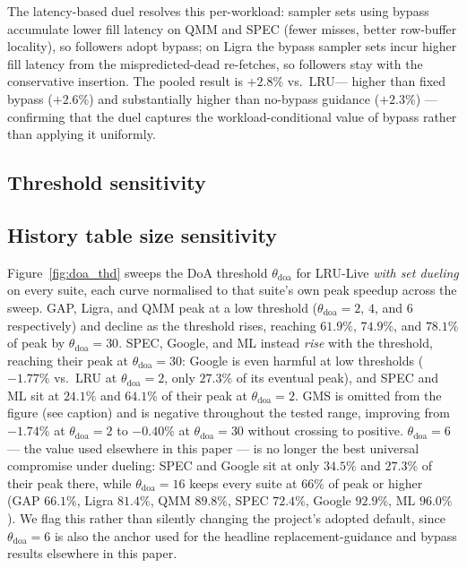 \documentclass[conference]{IEEEtran}
\newcommand{\lru}{\textsc{LRU}\xspace}
\begin{document}
The latency-based duel resolves this per-workload: sampler sets using bypass
accumulate lower fill latency on QMM and SPEC (fewer misses, better row-buffer
locality), so followers adopt bypass; on Ligra the bypass sampler sets incur
higher fill latency from the mispredicted-dead re-fetches, so followers stay with
the conservative insertion.
The pooled result is $+2.8\%$ vs.\ \lru --- higher than fixed bypass ($+2.6\%$)
and substantially higher than no-bypass guidance ($+2.3\%$) --- confirming that the
duel captures the workload-conditional value of bypass rather than applying it
uniformly.

\subsection{Threshold sensitivity}
\label{sec:thd_sens}

\subsection{History table size sensitivity}
\label{sec:llcsize}

Figure~\ref{fig:doa_thd} sweeps the DoA threshold $\theta_{\mathrm{doa}}$ for
\lru-Live \emph{with set dueling} on every suite, each curve normalised to
that suite's own peak speedup across the sweep. GAP, Ligra, and QMM peak at
a low threshold ($\theta_{\mathrm{doa}}=2$, $4$, and $6$ respectively) and
decline as the threshold rises, reaching $61.9\%$, $74.9\%$, and $78.1\%$ of
peak by $\theta_{\mathrm{doa}}=30$. SPEC, Google, and ML instead \emph{rise}
with the threshold, reaching their peak at $\theta_{\mathrm{doa}}=30$: Google
is even harmful at low thresholds ($-1.77\%$ vs.\ \lru at
$\theta_{\mathrm{doa}}=2$, only $27.3\%$ of its eventual peak), and SPEC and
ML sit at $24.1\%$ and $64.1\%$ of their peak at $\theta_{\mathrm{doa}}=2$.
GMS is omitted from the figure (see caption) and is negative throughout the
tested range, improving from $-1.74\%$ at $\theta_{\mathrm{doa}}=2$ to
$-0.40\%$ at $\theta_{\mathrm{doa}}=30$ without crossing to positive.
$\theta_{\mathrm{doa}}=6$ --- the value used elsewhere in this paper --- is
no longer the best universal compromise under dueling: SPEC and Google sit
at only $34.5\%$ and $27.3\%$ of their peak there, while
$\theta_{\mathrm{doa}}=16$ keeps every suite at $66\%$ of peak or higher
(GAP $66.1\%$, Ligra $81.4\%$, QMM $89.8\%$, SPEC $72.4\%$, Google $92.9\%$,
ML $96.0\%$). We flag this rather than silently changing the project's
adopted default, since $\theta_{\mathrm{doa}}=6$ is also the anchor used for
the headline replacement-guidance and bypass results elsewhere in this
paper.
\end{document}
